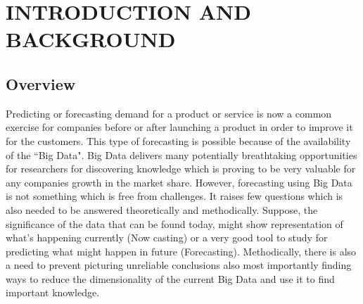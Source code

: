 %
%
%






\pagestyle{myheadings} %
\setcounter{page}{1}

\chapter{\uppercase {Introduction and Background}}
\section{Overview}

\setlength{\parindent}{2em}
\indent 
	Predicting or forecasting demand for a product or service is now a common exercise for companies before or after launching a product in order to improve it for the customers. This type of forecasting is possible because of the availability of the ``Big Data". Big Data delivers many potentially breathtaking opportunities for researchers for discovering knowledge which is proving to be very valuable for any companies growth in the market share. However, forecasting using Big Data is not something which is free from challenges. It raises few questions which is also needed to be answered theoretically and methodically. Suppose, the significance of the data that can be found today, might show representation of what’s happening currently (Now casting) or a very good tool to study for predicting what might happen in future (Forecasting). Methodically, there is also a need to prevent picturing unreliable conclusions also most importantly finding ways to reduce the dimensionality of the current Big Data and use it to find important knowledge.   

